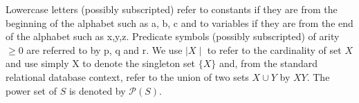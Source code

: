 \medskip

Lowercase letters (possibly subscripted) refer to constants if they are from the beginning of the alphabet such as a, b, c and to variables if they are from the end of the alphabet such as x,y,z.  Predicate symbols (possibly subscripted) of arity $\ge 0$ are referred to by
p, q and r. 
We use $\mid X \mid$ to refer to the cardinality of set $X$ and use simply
X to denote the singleton set $\{ X \}$ and, from the standard
relational database context, refer to the union of
two sets $X \cup Y$ by $XY$. The power set of $S$ is
denoted by $\mathcal{P}(S)$. 
